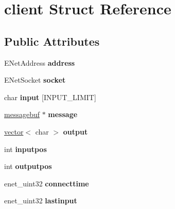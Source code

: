 \hypertarget{structclient}{}\section{client Struct Reference}
\label{structclient}
\subsection*{Public Attributes}
\begin{DoxyCompactItemize}
\item 
\mbox{\label{structclient_ac73e88565012803f65fc5b5f2be32252}} 
E\+Net\+Address {\bfseries address}
\item 
\mbox{\label{structclient_a636ca58d7fe24e2aa0106b1c5da903e0}} 
E\+Net\+Socket {\bfseries socket}
\item 
\mbox{\label{structclient_a83b3ee389e5166fa852db052d50dabdf}} 
char {\bfseries input} \mbox{[}I\+N\+P\+U\+T\+\_\+\+L\+I\+M\+IT\mbox{]}
\item 
\mbox{\label{structclient_ad4247c8cc8cc217f535f93e581f100f5}} 
\hyperlink{structmessagebuf}{messagebuf} $\ast$ {\bfseries message}
\item 
\mbox{\label{structclient_a3f85a35a8b007d5b89821f9219ed13a0}} 
\hyperlink{structvector}{vector}$<$ char $>$ {\bfseries output}
\item 
\mbox{\label{structclient_a9edfa1f7885780b718dfa5d57f6b368b}} 
int {\bfseries inputpos}
\item 
\mbox{\label{structclient_ae714dd677ac44a935a603a4f918bd06e}} 
int {\bfseries outputpos}
\item 
\mbox{\label{structclient_a6a61070ed4219f32678394384754ed5d}} 
enet\+\_\+uint32 {\bfseries connecttime}
\item 
\mbox{\label{structclient_a89cf74f72fc6beee69f75f81d4ab959f}} 
enet\+\_\+uint32 {\bfseries lastinput}
\item 
\mbox{\label{structclient_a9e9f7389b4d687a0b8151a0eeb13ed48}} 

\end{DoxyCompactItemize}
